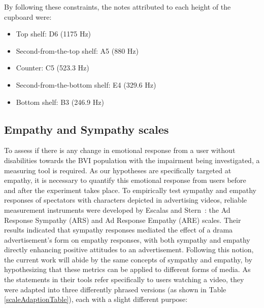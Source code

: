 \documentclass{vgtc}                          %
\begin{document}
\begin{itemize}
        
        By following these constraints, the notes attributed to each height of the cupboard were: 
        \begin{itemize}
        \item Top shelf: D6 (1175 Hz)
        \item Second-from-the-top shelf: A5 (880 Hz)
        \item Counter: C5 (523.3 Hz)
        \item Second-from-the-bottom shelf: E4 (329.6 Hz)
        \item Bottom shelf: B3 (246.9 Hz)
        \end{itemize}

        
\end{itemize}

\subsection{Empathy and Sympathy scales}

To assess if there is any change in emotional response from a user without disabilities towards the BVI population with the impairment being investigated, a measuring tool is required. As our hypotheses are specifically targeted at empathy, it is necessary to quantify this emotional response from users before and after the experiment takes place. To empirically test sympathy and empathy responses of spectators with characters depicted in advertising videos, reliable measurement instruments were developed by Escalas and Stern~\cite{Escalas:2003}: the Ad Response Sympathy (ARS) and Ad Response Empathy (ARE) scales. Their results indicated that sympathy responses mediated the effect of a drama advertisement's form on empathy responses, with both sympathy and empathy directly enhancing positive attitudes to an advertisement. Following this notion, the current work will abide by the same concepts of sympathy and empathy, by hypothesizing that these metrics can be applied to different forms of media. As the statements in their tools refer specifically to users watching a video, they were adapted into three differently phrased versions (as shown in Table \ref{scaleAdaptionTable}), each with a slight different purpose:

\end{document}
